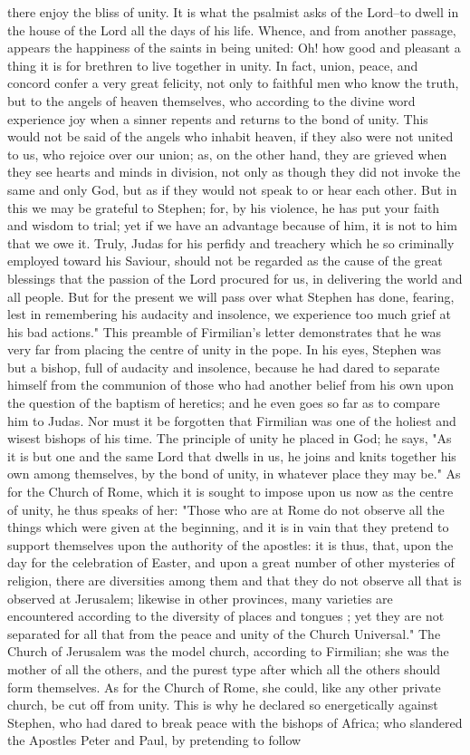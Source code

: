 there enjoy the bliss of unity. It is what the psalmist asks of the Lord--to dwell in the house of the Lord all the days of his life. Whence, and from another passage, appears the happiness of the saints in being united: Oh! how good and pleasant a thing it is for brethren to live together in unity. In fact, union, peace, and concord confer a very great felicity, not only to faithful men who know the truth, but to the angels of heaven themselves, who according to the divine word experience joy when a sinner repents and returns to the bond of unity. This would not be said of the angels who inhabit heaven, if they also were not united to us, who rejoice over our union; as, on the other hand, they are grieved when they see hearts and minds in division, not only as though they did not invoke the same and only God, but as if they would not speak to or hear each other. But in this we may be grateful to Stephen; for, by his violence, he has put your faith and wisdom to trial; yet if we have an advantage because of him, it is not to him that we owe it. Truly, Judas for his perfidy and treachery which he so criminally employed toward his Saviour, should not be regarded as the cause of the great blessings that the passion of the Lord procured for us, in delivering the world and all people. But for the present we will pass over what Stephen has done, fearing, lest in remembering his audacity and insolence, we experience too much grief at his bad actions." This preamble of Firmilian’s letter demonstrates that he was very far from placing the centre of unity in the pope. In his eyes, Stephen was but a bishop, full of audacity and insolence, because he had dared to separate himself from the communion of those who had another belief from his own upon the question of the baptism of heretics; and he even goes so far as to compare him to Judas. Nor must it be forgotten that Firmilian was one of the holiest and wisest bishops of his time. The principle of unity he placed in God; he says, "As it is but one and the same Lord that dwells in us, he joins and knits together his own among themselves, by the bond of unity, in whatever place they may be." As for the Church of Rome, which it is sought to impose upon us now as the centre of unity, he thus speaks of her: "Those who are at Rome do not observe all the things which were given at the beginning, and it is in vain that they pretend to support themselves upon the authority of the apostles: it is thus, that, upon the day for the celebration of Easter, and upon a great number of other mysteries of religion, there are diversities among them and that they do not observe all that is observed at Jerusalem; likewise in other provinces, many varieties are encountered according to the diversity of places and tongues ; yet they are not separated for all that from the peace and unity of the Church Universal." The Church of Jerusalem was the model church, according to Firmilian; she was the mother of all the others, and the purest type after which all the others should form themselves. As for the Church of Rome, she could, like any other private church, be cut off from unity. This is why he declared so energetically against Stephen, who had dared to break peace with the bishops of Africa; who slandered the Apostles Peter and Paul, by pretending to follow 